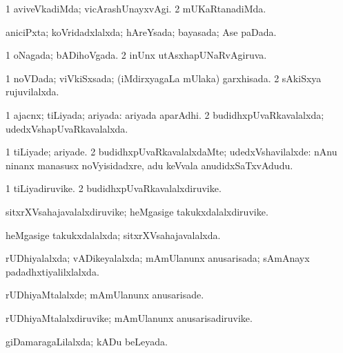 \bentry 
{} 
\gl{\kirxvi}
\expl{}
\bmng
\bnum
\num{1} aviveVkadiMda; vicArashUnayxvAgi. 
\num{2} mUKaRtanadiMda. 
\enum
\emng
\eentry

\bentry
{} 
\gl{\gu}
\expl{}
\bmng
aniciPxta; koVridadxlalxda; hAreYsada; bayasada; Ase paDada. 
\emng
\eentry

\bentry
{} 
\gl{\gu}
\expl{}
\bmng
\bnum
\num{1} oNagada; bADihoVgada. 
\num{2} inUnx utAsxhapUNaRvAgiruva. 
\enum
\emng
\eentry

\bentry
{} 
\gl{\gu}
\expl{}
\bmng
\bnum
\num{1} noVDada; viVkiSxsada; (iMdirxyagaLa mUlaka) garxhisada. 
\num{2} sAkiSxya rujuvilalxda. 
\enum
\emng
\eentry

\bentry
{} 
\gl{\gu}
\expl{}
\bmng
\bnum
\num{1} ajacnx; tiLiyada; ariyada:  ariyada aparAdhi. 
\num{2} budidhxpUvaRkavalalxda; udedxVshapUvaRkavalalxda. 
\enum
\emng
\eentry

\bentry
{} 
\gl{\kirxvi}
\expl{}
\bmng
\bnum
\num{1} tiLiyade; ariyade. 
\num{2} budidhxpUvaRkavalalxdaMte; udedxVshavilalxde:  nAnu ninanx manasusx noVyisidadxre, adu keVvala anudidxSaTxvAdudu. 
\enum
\emng
\eentry

\bentry
{} 
\gl{\nA}
\expl{}
\bmng
\bnum
\num{1} tiLiyadiruvike. 
\num{2} budidhxpUvaRkavalalxdiruvike. 
\enum
\emng
\eentry

\bentry
{} 
\gl{\nA}
\expl{}
\bmng
sitxrXVsahajavalalxdiruvike; heMgasige takukxdalalxdiruvike. 
\emng
\eentry

\bentry
{} 
\gl{\gu}
\expl{}
\bmng
heMgasige takukxdalalxda; sitxrXVsahajavalalxda. 
\emng
\eentry

\bentry
{} 
\gl{\gu}
\expl{}
\bmng
rUDhiyalalxda; vADikeyalalxda; mAmUlanunx anusarisada; sAmAnayx padadhxtiyalilxlalxda. 
\emng
\eentry

\bentry
{} 
\gl{\kirxvi}
\expl{}
\bmng
rUDhiyaMtalalxde; mAmUlanunx anusarisade. 
\emng
\eentry

\bentry
{} 
\gl{\nA}
\expl{}
\bmng
rUDhiyaMtalalxdiruvike; mAmUlanunx anusarisadiruvike. 
\emng
\eentry

\bentry
{} 
\gl{\gu}
\expl{}
\bmng
giDamaragaLilalxda; kADu beLeyada. 
\emng
\eentry

